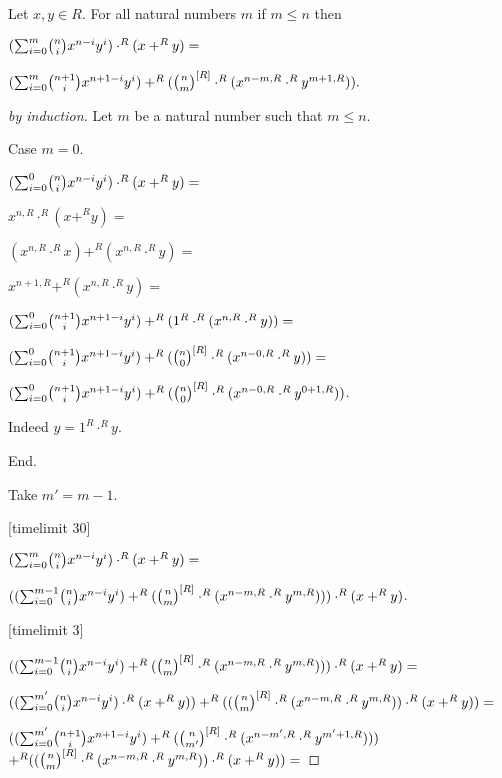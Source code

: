 \documentclass[11pt]{article}
\begin{document}
\begin{forthel}

\begin{lemma}
Let $x,y \in R$. For all natural numbers $m$ if $m \leq n$ then

$(\binsum{m}{n}{x}{y}{R}) \cdot^{R} (x +^{R} y) =$

$(\binsum{m}{n+1}{x}{y}{R}) +^{R} 
(\cho{n}{m}^{[R]} \cdot^{R} (x^{n-m,R} \cdot^{R} y^{m+1,R})).$
\end{lemma}

\begin{proof}[by induction]
Let $m$ be a natural number such that $m \leq n$.

Case $m = 0$. 

$(\binsum{0}{n}{x}{y}{R}) \cdot^{R} (x +^{R} y) =$

$x^{n,R} \cdot^{R} (x +^{R} y) =$

$(x^{n,R} \cdot^{R} x) +^{R} (x^{n,R} \cdot^{R} y) =$

$x^{n+1,R} +^{R} (x^{n,R} \cdot^{R} y) =$

$(\binsum{0}{n+1}{x}{y}{R}) +^{R} (1^{R} \cdot^{R}(x^{n,R} \cdot^{R} y)) =$

$(\binsum{0}{n+1}{x}{y}{R}) +^{R} (\cho{n}{0}^{[R]} \cdot^{R}(x^{n-0,R} \cdot^{R} y)) =$

$(\binsum{0}{n+1}{x}{y}{R}) +^{R} (\cho{n}{0}^{[R]} \cdot^{R}(x^{n-0,R} \cdot^{R} y^{0+1,R}))$.

Indeed $y = 1^{R} \cdot^{R} y$.

End.

Take $m' = m-1$.

[timelimit 30]

$(\binsum{m}{n}{x}{y}{R}) \cdot^{R} (x +^{R} y) = $

$((\binsum{m-1}{n}{x}{y}{R}) +^{R} 
(\cho{n}{m}^{[R]} \cdot^{R} (x^{n - m,R} \cdot^{R} y^{m,R}))) \cdot^{R} (x +^{R} y)$.

[timelimit 3]

$((\binsum{m-1}{n}{x}{y}{R}) +^{R} 
(\cho{n}{m}^{[R]} \cdot^{R} (x^{n - m,R} \cdot^{R} y^{m,R}))) \cdot^{R} (x +^{R} y) =$

$ ((\binsum{m'}{n}{x}{y}{R}) \cdot^{R} (x +^{R} y)) +^{R} 
((\cho{n}{m}^{[R]} \cdot^{R} (x^{n - m,R} \cdot^{R} y^{m,R})) \cdot^{R} (x +^{R} y)) =$

$ ((\binsum{m'}{n+1}{x}{y}{R}) +^{R} (\cho{n}{m'}^{[R]} \cdot^{R} (x^{n-m',R} \cdot^{R} y^{m'+1,R}))) $
$ +^{R} ((\cho{n}{m}^{[R]} \cdot^{R} (x^{n - m,R} \cdot^{R} y^{m,R})) \cdot^{R} (x +^{R} y)) =$


\end{proof}
\end{forthel}
\end{document}
